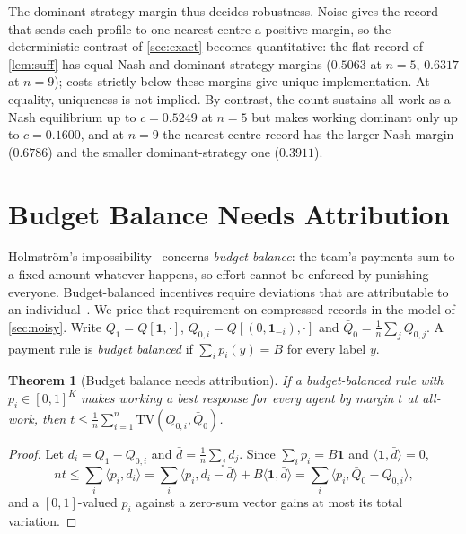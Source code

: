 \documentclass[sigconf,anonymous,acmthm=false]{aamas}
\theoremstyle{acmplain}
\newtheorem{theorem}{Theorem}
\theoremstyle{acmdefinition}
\newcommand{\TV}{\mathrm{TV}}
\begin{document}
The dominant-strategy margin thus decides robustness. Noise gives the record that sends each profile to
one nearest centre a positive margin, so the deterministic contrast of \cref{sec:exact}
becomes quantitative: the flat record of \cref{lem:suff} has equal Nash and dominant-strategy margins
($0.5063$ at $n=5$, $0.6317$ at $n=9$); costs strictly below these margins give
unique implementation. At equality, uniqueness is not implied.
By contrast, the count sustains all-work as a Nash equilibrium up to $c=0.5249$ at $n=5$ but
makes working dominant only up to $c=0.1600$, and at $n=9$ the nearest-centre record has
the larger Nash margin ($0.6786$) and the smaller dominant-strategy one ($0.3911$).

\section{Budget Balance Needs Attribution}\label{sec:bb}

Holmstr\"om's impossibility~\cite{holmstrom1982teams} concerns \emph{budget balance}: the
team's payments sum to a fixed amount whatever happens, so effort cannot be enforced by
punishing everyone. Budget-balanced incentives require deviations that are attributable to
an individual~\cite{legrosmatthews1993,rahmanobara2010}. We price that requirement on
compressed records in the model of \cref{sec:noisy}. Write $Q_1=Q[\mathbf1,\cdot]$,
$Q_{0,i}=Q[(0,\mathbf1_{-i}),\cdot]$ and $\bar Q_0=\frac1n\sum_jQ_{0,j}$. A payment rule is
\emph{budget balanced} if $\sum_ip_i(y)=B$ for every label $y$.

\begin{theorem}[Budget balance needs attribution]\label{thm:bb}
If a budget-balanced rule with $p_i\in[0,1]^K$ makes working a best response for every agent
by margin $t$ at all-work, then $t\le\frac1n\sum_{i=1}^n\TV(Q_{0,i},\bar Q_0)$.
\end{theorem}

\begin{proof}
Let $d_i=Q_1-Q_{0,i}$ and $\bar d=\frac1n\sum_jd_j$. Since $\sum_ip_i=B\mathbf1$ and
$\langle\mathbf1,\bar d\rangle=0$,
\[ nt\le\sum_i\langle p_i,d_i\rangle=\sum_i\langle p_i,d_i-\bar d\rangle+B\langle\mathbf1,\bar d\rangle=\sum_i\langle p_i,\bar Q_0-Q_{0,i}\rangle, \]
and a $[0,1]$-valued $p_i$ against a zero-sum vector gains at most its total variation.
\end{proof}
\end{document}
